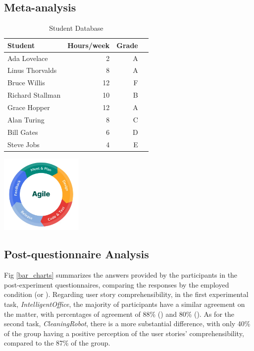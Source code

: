 \subsection{Meta-analysis}
\begin{table}[H]
    \begin{minipage}[b]{0.56\linewidth}
        \centering
        \begin{tabular}{ | l | r | r | r |}
            \hline
            Student & Hours/week & Grade \\ \hline \hline
            Ada Lovelace & 2 & A \\ \hline
            Linus Thorvalds & 8 & A \\ \hline
            Bruce Willis & 12 & F \\ \hline
            Richard Stallman & 10 & B \\ \hline
            Grace Hopper & 12 & A \\ \hline
            Alan Turing & 8 & C \\ \hline
            Bill Gates & 6 & D \\ \hline
            Steve Jobs & 4 & E \\ \hline
        \end{tabular}
        \caption{Student Database}
        \label{table:student}
    \end{minipage}\hfill
    \begin{minipage}[b]{0.4\linewidth}
        \centering
        \includegraphics[width=40mm]{figures/agile_model.jpg}
        \label{fig:image}
    \end{minipage}
\end{table}



\subsection{Post-questionnaire Analysis}
Fig \ref{bar_charts} summarizes the answers provided by the participants in the post-experiment questionnaires, comparing the responses by the employed condition (\tdd or \notdd).
Regarding user story comprehensibility, in the first experimental task, \textit{IntelligentOffice}, the majority of participants have a similar agreement on the matter, with percentages of agreement of 88\% (\tdd) and 80\% (\notdd). As for the second task, \textit{CleaningRobot}, there is a more substantial difference, with only 40\% of the \tdd group having a positive perception of the user stories' comprehensibility, compared to the 87\% of the \notdd group.

